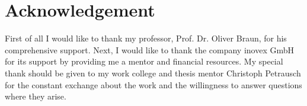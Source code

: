 \chapter*{Acknowledgement}
First of all I would like to thank my professor, Prof. Dr. Oliver Braun, for his comprehensive support. Next, I would like to thank the company inovex GmbH for its support by providing me a mentor and financial resources. My special thank should be given to my work college and thesis mentor Christoph Petrausch for the constant exchange about the work and the willingness to answer questions where they arise.